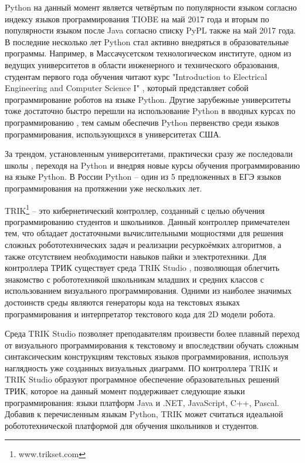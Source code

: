 \documentclass[14pt]{matmex-diploma-custom}
\begin{document}
Python на данный момент является четвёртым по популярности языком согласно индексу языков программирования TIOBE \cite{indextiobe} на май 2017 года и вторым по популярности языком после Java согласно списку PyPL \cite{indexpypl} также на май 2017 года. В последние несколько лет Python стал активно внедряться в образовательные программы. Например, в Массачусетском технологическом институте, одном из ведущих университетов в области инженерного и технического образования, студентам первого года обучения читают курс "Introduction to Electrical Engineering and Computer Science I" \cite{stemMITCourse}, который представляет собой программирование роботов на языке Python. Другие зарубежные университеты тоже достаточно быстро перешли на использование Python в вводных курсах по программированию \cite{pythonUni}, тем самым обеспечив Python первенство среди языков программирования, использующихся в университетах США.

За трендом, установленным университетами, практически сразу же последовали школы \cite{stemSecCourse, stemSchool}, переходя на Python и внедряя новые курсы обучения программированию на языке Python. В России Python -- один из 5 предложенных в ЕГЭ языков программирования на протяжении уже нескольких лет.

TRIK\footnote{www.trikset.com} -- это кибернетический контроллер, созданный с целью обучения программированию студентов и школьников. Данный контроллер примечателен тем, что обладает достаточными вычислительными мощностями для решения сложных робототехнических задач и реализации ресуркоёмких алгоритмов, а также отсутствием необходимости навыков пайки и электротехники. Для контроллера ТРИК существует среда TRIK Studio \cite{qrealRobots, TRIKStudioTech}, позволяющая облегчить знакомство с робототехникой школьникам младших и средних классов с использованием визуального программирования. Одними из наиболее значимых достоинств среды являются генераторы кода на текстовых языках программирования и интерпретатор текстового кода для 2D модели робота. 

Среда TRIK Studio позволяет преподавателям произвести более плавный переход от визуального программирования к текстовому и впоследствии обучать сложным синтаксическим конструкциям текстовых языков программирования, используя наглядность уже созданных визуальных диаграмм. ПО контроллера TRIK и TRIK Studio образуют программное обеспечение образовательных решений ТРИК, которое на данный момент поддерживает следующие языки программирования: языки платформ Java и .NET, JavaScript, C++, Pascal. Добавив к перечисленным языкам Python, TRIK может считаться идеальной робототехнической платформой для обучения школьников и студентов.
\end{document}
